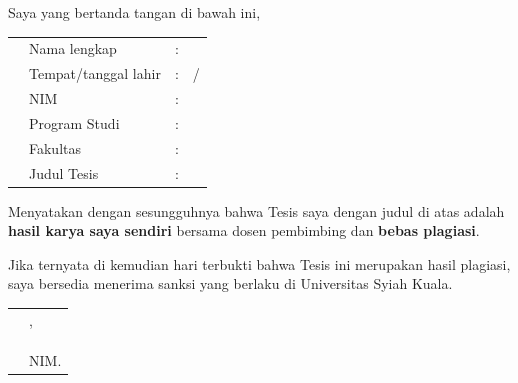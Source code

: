 %
\bplagiasi %

\noindent
Saya yang bertanda tangan di bawah ini,

\vspace{-0.1cm}

\begin{table}[H]
\begin{tabularx}{\textwidth}{@{}M{0.6cm}p{3.9cm}c >{\raggedright\arraybackslash}X@{}}
	&Nama lengkap   		&: & \fullname \\
	&Tempat/tanggal lahir	&: & \tempatlahir{}/ \tanggallahir \\
	&NIM       			&: & \idnum{}    \\
	&Program Studi   		&: & \programstudi \\
	&Fakultas 				&: & \faculty \\
	&Judul Tesis      &: & \MakeUppercase{\judul}
\end{tabularx}
\end{table}

\vspace{0.2cm}
\noindent
Menyatakan dengan sesungguhnya bahwa Tesis saya dengan judul di atas adalah \textbf{hasil karya saya sendiri} bersama dosen pembimbing dan \textbf{bebas plagiasi}.

\vspace{1cm}
\noindent
Jika ternyata di kemudian hari terbukti bahwa Tesis ini merupakan hasil plagiasi, saya bersedia menerima sanksi yang berlaku di Universitas Syiah Kuala.

\vspace{1cm}

\begin{tabular}{p{7.5cm}l}
	&\city, \disahkantanggal\\
	&\\
	&\\
	&\multirow{1.5}{7.5cm}{\underline{\fullname}} \\
	&NIM. \idnum \\
\end{tabular}